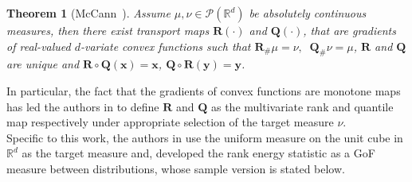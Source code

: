 \documentclass{article}
\newtheorem{theorem}{Theorem}
\begin{document}

\begin{theorem}[McCann~\cite{mccann1995existence}] \label{Theorem 1}
Assume $\mu, \nu \in \mathcal P(\mathbb R^d)$ be absolutely continuous measures, then there exist transport maps $\mathbf{R}(\cdot)$ and $\mathbf{Q}(\cdot)$, that are gradients of real-valued $d$-variate convex functions such that $\mathbf{R}_\# \mu =\nu, \;\; \mathbf{Q}_\#\nu = \mu$, $\mathbf{R}$ and $\mathbf{Q}$ are unique and $\mathbf{R}\circ \mathbf{Q}(\bm{x}) = \bm{x}$, $\mathbf{Q}\circ \mathbf{R}(\bm{y}) = \bm{y}$.
\end{theorem}
In particular, the fact that the gradients of convex functions are monotone maps \cite{mccann1995existence} has led the authors in \cite{deb2021multivariate, hallin2017distribution} to define $\mathbf{R}$ and $\mathbf{Q}$ as the multivariate rank and quantile map respectively under  appropriate selection of the target measure $\nu$. \\
Specific to this work, the authors in \cite{deb2021multivariate} use the uniform measure on the unit cube in $\mathbb R^d$ as the target measure and, developed the rank energy statistic as a GoF measure between distributions, whose sample version is stated below.\\

\end{document}
